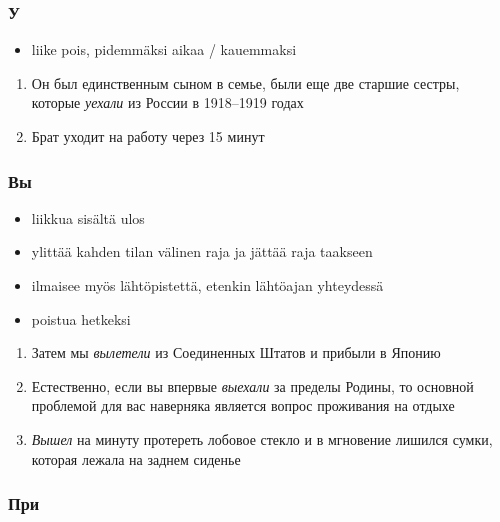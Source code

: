 \documentclass[]{scrartcl}
\providecommand{\tightlist}{%
  \setlength{\itemsep}{0pt}\setlength{\parskip}{0pt}}
\begin{document}
\subsubsection{У}\label{ux443}

\begin{itemize}
\tightlist
\item
  liike pois, pidemmäksi aikaa / kauemmaksi
\end{itemize}

\begin{enumerate}
\def\labelenumi{(\arabic{enumi})}
\setcounter{enumi}{420}
\tightlist
\item
  Он был единственным сыном в семье, были еще две старшие сестры,
  которые \emph{уехали} из России в 1918--1919 годах
\item
  Брат уходит на работу через 15 минут
\end{enumerate}

\subsubsection{Вы}\label{ux432ux44b}

\begin{itemize}
\tightlist
\item
  liikkua sisältä ulos
\item
  ylittää kahden tilan välinen raja ja jättää raja taakseen\\
\item
  ilmaisee myös lähtöpistettä, etenkin lähtöajan yhteydessä
\item
  poistua hetkeksi
\end{itemize}

\begin{enumerate}
\def\labelenumi{(\arabic{enumi})}
\setcounter{enumi}{422}
\tightlist
\item
  Затем мы \emph{вылетели} из Соединенных Штатов и прибыли в Японию
\item
  Естественно, если вы впервые \emph{выехали} за пределы Родины, то
  основной проблемой для вас наверняка является вопрос проживания на
  отдыхе
\item
  \emph{Вышел} на минуту протереть лобовое стекло и в мгновение лишился
  сумки, которая лежала на заднем сиденье
\end{enumerate}

\subsubsection{При}\label{ux43fux440ux438}
\end{document}
